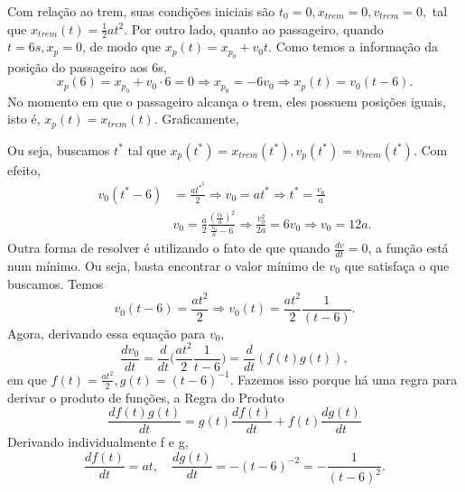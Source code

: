 \documentclass[physics_notes.tex]{subfiles}
\begin{document}
Com relação ao trem, suas condições iniciais são $t_{0} = 0, x_{trem} = 0, v_{trem} = 0,$ tal que $x_{trem}(t) = \frac{1}{2}at^{2}$.
Por outro lado, quanto ao passageiro, quando $t=6s, x_{p} = 0$, de modo que $x_{p}(t) = x_{p_0} + v_{0}t$. Como temos a informação da posição
do passageiro aos 6s,
$$
	x_{p}(6) = x_{p_{0}} + v_{0} \cdot6 = 0 \Rightarrow x_{p_{0}} = -6v_{0} \Rightarrow x_{p}(t) = v_{0}(t-6).
$$
No momento em que o passageiro alcança o trem, eles possuem posições iguais, isto é, $x_{p}(t) = x_{trem}(t)$. Graficamente,
\begin{center}
\end{center}
Ou seja, buscamos $t^{*}$ tal que $x_{p}(t^{*}) = x_{trem}(t^{*}), v_{p}(t^{*}) = v_{trem}(t^{*})$. Com efeito,
\begin{align*}
	v_{0}(t^{*} - 6) & = \frac{at^{*^{2}}}{2} \Rightarrow v_{0} = at^{*} \Rightarrow t^{*} = \frac{v_{0}}{a}                                                 \\
	                 & v_{0} = \frac{a}{2}\frac{(\frac{v_{0}}{a})^{2}}{\frac{v_{0}}{a}-6} \Rightarrow \frac{v_{0}^{2}}{2a} = 6v_{0} \Rightarrow v_{0} = 12a.
\end{align*}
Outra forma de resolver é utilizando o fato de que quando $\frac{dv}{dt} = 0$, a função está num mínimo. Ou seja, basta encontrar
o valor mínimo de $v_{0}$ que satisfaça o que buscamos. Temos
$$
	v_{0}(t-6) = \frac{at^{2}}{2} \Rightarrow v_{0}(t) = \frac{at^{2}}{2}\frac{1}{(t-6)}.
$$
Agora, derivando essa equação para $v_{0},$
$$
	\frac{dv_{0}}{dt} = \frac{d}{dt}\biggl(\frac{at^{2}}{2}\frac{1}{t-6}\biggr) = \frac{d}{dt}(f(t)g(t)),
$$
em que $f(t) = \frac{at^{2}}{2}, g(t) = (t-6)^{-1}$. Fazemos isso porque há uma regra para derivar o produto de funções,
a Regra do Produto
$$
	\boxed{\frac{df(t)g(t)}{dt}= g(t)\frac{df(t)}{dt} + f(t)\frac{dg(t)}{dt}}
$$
Derivando individualmente f e g,
$$
	\frac{df(t)}{dt} = at, \quad \frac{dg(t)}{dt} = -(t-6)^{-2} = -\frac{1}{(t-6)^{2}}.
$$
\end{document}

